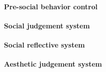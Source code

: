 \paragraph{Pre-social behavior control} 

\paragraph{Social judgement system}

\paragraph{Social reflective system}

\paragraph{Aesthetic judgement system}